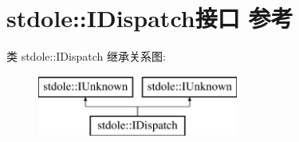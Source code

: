\hypertarget{interfacestdole_1_1_i_dispatch}{}\section{stdole\+:\+:I\+Dispatch接口 参考}
\label{interfacestdole_1_1_i_dispatch}
类 stdole\+:\+:I\+Dispatch 继承关系图\+:\begin{figure}[H]
\begin{center}
\leavevmode
\includegraphics[height=2.000000cm]{interfacestdole_1_1_i_dispatch}
\end{center}
\end{figure}
